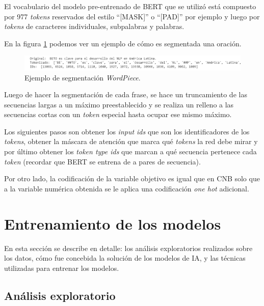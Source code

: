 El vocabulario del modelo pre-entrenado de BERT que se utilizó está compuesto por 977 \textit{tokens} reservados del estilo ``[MASK]'' o ``[PAD]'' por ejemplo y luego por \textit{tokens} de caracteres individuales, subpalabras y palabras. \citep{WEBSITE:22}

En la figura \ref{fig:segmentacion-bert} podemos ver un ejemplo de cómo es segmentada una oración.

\begin{figure}[htbp]
	\centering
	\includegraphics[width=1\textwidth]{./Figures/cap3-segmentacion.png}
	\caption{Ejemplo de segmentación \textit{WordPiece}\protect\footnotemark.}
	\label{fig:segmentacion-bert}
\end{figure}


Luego de hacer la segmentación de cada frase, se hace un truncamiento de las secuencias largas a un máximo preestablecido y se realiza un relleno a las secuencias cortas con un \textit{token} especial hasta ocupar ese mismo máximo.

Los siguientes pasos son obtener los \textit{input ids} que son los identificadores de los \textit{tokens}, obtener la máscara de atención que marca qué \textit{tokens} la red debe mirar y por último obtener los \textit{token type ids} que marcan a qué secuencia pertenece cada \textit{token} (recordar que BERT se entrena de a pares de secuencia).

Por otro lado, la codificación de la variable objetivo es igual que en CNB solo que a la variable numérica obtenida se le aplica una codificación \textit{one hot} adicional.

\section{Entrenamiento de los modelos}

En esta sección se describe en detalle: los análisis exploratorios realizados sobre los datos, cómo fue concebida la solución de los modelos de IA, y las técnicas utilizadas para entrenar los modelos.

\subsection{Análisis exploratorio}

